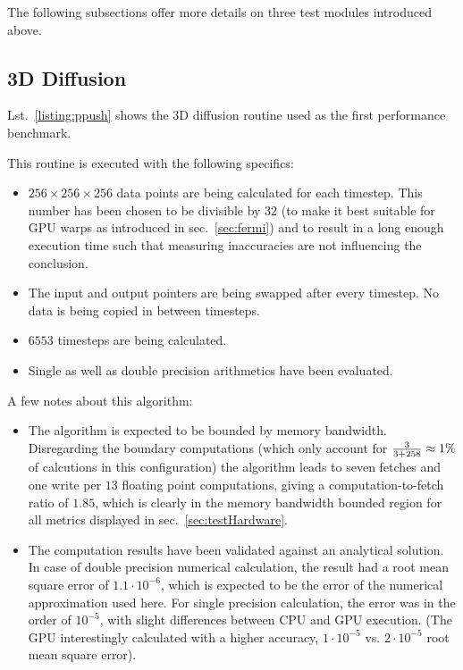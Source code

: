The following subsections offer more details on three test modules introduced above.

\subsection{3D Diffusion} \label{sub:test3DDiffusion}

Lst.~\ref{listing:ppush} shows the 3D diffusion routine used as the first performance benchmark.

This routine is executed with the following specifics:
\begin{itemize}
  \item $256\times256\times256$ data points are being calculated for each timestep. This number has been chosen to be divisible by 32 (to make it best suitable for GPU warps as introduced in sec.~\ref{sec:fermi}) and to result in a long enough execution time such that measuring inaccuracies are not influencing the conclusion.
 \item The input and output pointers are being swapped after every timestep. No data is being copied in between timesteps.
 \item $6553$ timesteps are being calculated.
 \item Single as well as double precision arithmetics have been evaluated.
\end{itemize}

A few notes about this algorithm: 
\begin{itemize}
 \item The algorithm is expected to be bounded by memory bandwidth. Disregarding the boundary computations (which only account for ${3\over{3+258}} \approx 1\%$ of calcutions in this configuration) the algorithm leads to seven fetches and one write per $13$ floating point computations, giving a computation-to-fetch ratio of $1.85$, which is clearly in the memory bandwidth bounded region for all metrics displayed in sec.~\ref{sec:testHardware}.
 \item The computation results have been validated against an analytical solution. In case of double precision numerical calculation, the result had a root mean square error of $1.1 \cdot 10^{-6}$, which is expected to be the error of the numerical approximation used here. For single precision calculation, the error was in the order of $10^{-5}$, with slight differences between CPU and GPU execution. (The GPU interestingly calculated with a higher accuracy, $1 \cdot 10^{-5}$ vs. $2 \cdot 10^{-5}$ root mean square error).
\end{itemize}

